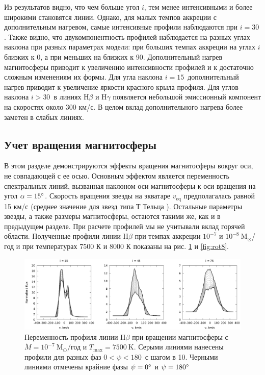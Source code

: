 \documentclass[12pt]{article}
\begin{document}
Из результатов видно, что чем больше угол $i$, тем менее интенсивными и более широкими становятся линии. Однако, для малых темпов аккреции с дополнительным нагревом, самые интенсивные профили наблюдаются при $i=30$\degree. Также видно, что двукомпонентность профилей наблюдается на разных углах наклона при разных параметрах модели: при больших темпах аккреции на углах $i$ близких к 0\degree, а при меньших на близких к 90\degree. Дополнительный нагрев магнитосферы приводит к увеличению интенсивности профилей и к достаточно сложным изменениям их формы. Для угла наклона $i=15$\degree\ дополнительный нагрев приводит к увеличение яркости красного крыла профиля. Для углов наклона $i > 30$\degree\ в линиях Н$\beta$ и H$\gamma$ появляется небольшой эмиссионный компонент на скоростях около 300 км/с. В целом вклад дополнительного нагрева более заметен в слабых линиях. 

\subsection{Учет вращения магнитосферы}

В этом разделе демонстрируются эффекты вращения магнитосферы вокруг оси, не совпадающей с ее осью. Основным эффектом является переменность спектральных линий, вызванная наклоном оси магнитосферы к оси вращения на угол $\alpha = 15\text{\degree}$. Скорость вращения звезды на экватаре $v_\text{eq}$ предполагалась равной 15 км/с (среднее значение для звезд типа Т Тельца \cite{petrov03}). Остальные параметры звезды, а также размеры магнитосферы, остаются такими же, как и в предыдущем разделе. При расчете профилей мы не учитывали вклад горячей области. Полученные профили линии H$\beta$ при темпах аккреции $10^{-7}$ и $10^{-8}\ \text{M}_\odot$/год и при температурах 7500 К и 8000 К показаны на рис. \ref{fig:rot7} и \ref{fig:rot8}.

\begin{figure}[h]
\centering
\includegraphics[width=\textwidth]{rot_7.eps}
\caption{Переменность профиля линии H$\beta$ при вращении магнитосферы с $\dot{M} = 10^{-7}\ \text{M}_\odot/$год и $T_\text{max} = 7500\ \text{K}$. Серыми линиями нанесены профили для разных фаз $0$\degree$< \psi < 180$\degree\ с шагом в 10\degree. Черными линиями отмечены крайние фазы $\psi = 0\text{\degree}$ и $\psi = 180\text{\degree}$}
\label{fig:rot7}
\end{figure}
\end{document}

